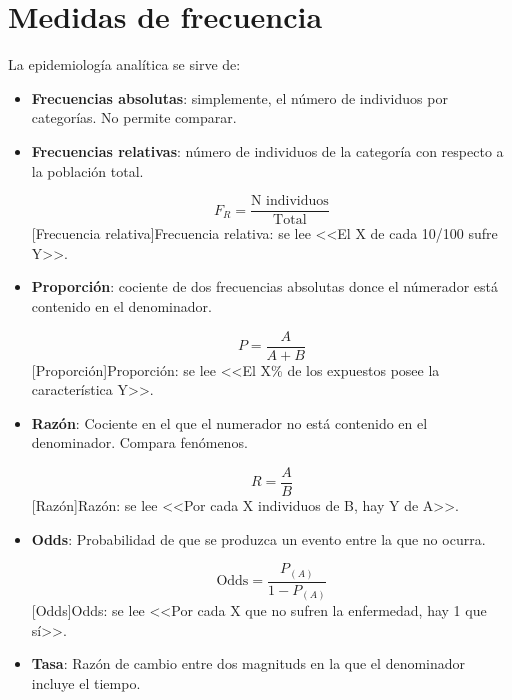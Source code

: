 \chapter{Medidas de frecuencia}
La epidemiología analítica se sirve de:
\begin{itemize}[itemsep=0pt,parsep=0pt,topsep=0pt,partopsep=0pt]
	\item \textbf{Frecuencias absolutas}: simplemente, el número de individuos por categorías. No permite comparar.
	\item\textbf{Frecuencias relativas}: número de individuos de la categoría con respecto a la población total.
	\begin{center}
		\begin{equation}
		F_R = \dfrac{\mbox{N individuos}}{\mbox{Total}}
		\end{equation}
		[Frecuencia relativa]{Frecuencia relativa: se lee <<El X de cada 10/100 sufre Y>>.}
	\end{center}
	\item\textbf{Proporción}: cociente de dos frecuencias absolutas donce el númerador está contenido en el denominador.
	\begin{center}
		\begin{equation}
		P = \dfrac{A}{A + B}
		\end{equation}
		[Proporción]{Proporción: se lee <<El X\% de los expuestos posee la característica Y>>.}
	\end{center}
	\item\textbf{Razón}: Cociente en el que el numerador no está contenido en el denominador. Compara fenómenos.
	\begin{center}
		\begin{equation}
		R = \dfrac{A}{B}
		\end{equation}
		[Razón]{Razón: se lee <<Por cada X individuos de B, hay Y de A>>.}
	\end{center}
	\item\textbf{Odds}: Probabilidad de que se produzca un evento entre la que no ocurra.
	\begin{center}
		\begin{equation}
		\mbox{Odds} = \dfrac{P_{(A)}}{1 - P_{(A)}}
		\end{equation}
		{Odds: se lee <<Por cada X que no sufren la enfermedad, hay 1 que sí>>.}
	\end{center}
	\item\textbf{Tasa}: Razón de cambio entre dos magnituds en la que el denominador incluye el tiempo.

\end{itemize}
